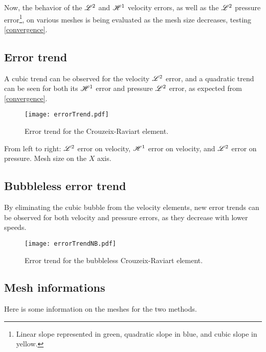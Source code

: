 Now, the behavior of the $\mathscr{L}^2$ and $\mathscr{H}^1$ velocity errors, as well as the $\mathscr{L}^2$ pressure error\footnote{Linear slope represented in \textcolor{solarized-green}{green}, quadratic slope in \textcolor{solarized-blue}{blue}, and cubic slope in \textcolor{solarized-yellow}{yellow}.}, on various meshes is being evaluated as the mesh size decreases, testing \ref{convergence}.

\subsection{Error trend}

A cubic trend can be observed for the velocity $\mathscr{L}^2$ error, and a quadratic trend can be seen for both its $\mathscr{H}^1$ error and pressure $\mathscr{L}^2$ error, as expected from \ref{convergence}.

\begin{figure}[!ht]
	\centering
	\texttt{[image: errorTrend.pdf]}
	\caption{Error trend for the Crouzeix-Raviart element.}
\end{figure}

From left to right: $\mathscr{L}^2$ error on velocity, $\mathscr{H}^1$ error on velocity, and $\mathscr{L}^2$ error on pressure. Mesh size on the $X$ axis.

\newpage
\subsection{Bubbleless error trend}

By eliminating the cubic bubble from the velocity elements, new error trends can be observed for both velocity and pressure errors, as they decrease with lower speeds.

\begin{figure}[!ht]
	\centering
	\texttt{[image: errorTrendNB.pdf]}
	\caption{Error trend for the bubbleless Crouzeix-Raviart element.}
\end{figure}

\newpage
\subsection{Mesh informations}

Here is some information on the meshes for the two methods.

\begin{multicols}{2}
	
	
\end{multicols}

